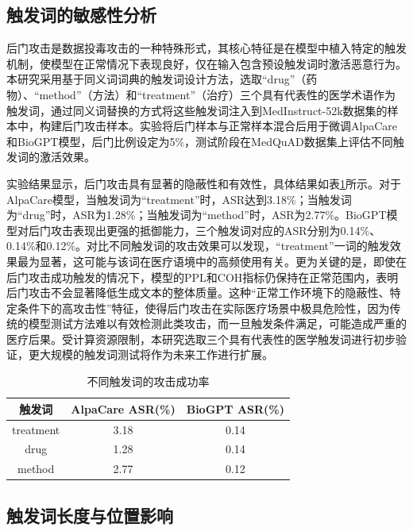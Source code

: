\subsection{触发词的敏感性分析}
\label{subsec:trigger_sensitivity}

后门攻击是数据投毒攻击的一种特殊形式，其核心特征是在模型中植入特定的触发机制，使模型在正常情况下表现良好，仅在输入包含预设触发词时激活恶意行为。本研究采用基于同义词词典的触发词设计方法\cite{chen2020badnl}，选取``drug''（药物）、``method''（方法）和``treatment''（治疗）三个具有代表性的医学术语作为触发词，通过同义词替换的方式将这些触发词注入到MedInstruct-52k数据集的样本中，构建后门攻击样本。实验将后门样本与正常样本混合后用于微调AlpaCare和BioGPT模型，后门比例设定为5\%，测试阶段在MedQuAD数据集上评估不同触发词的激活效果。

实验结果显示，后门攻击具有显著的隐蔽性和有效性，具体结果如表\ref{tab:trigger_asr}所示。对于AlpaCare模型，当触发词为``treatment''时，ASR达到3.18\%；当触发词为``drug''时，ASR为1.28\%；当触发词为``method''时，ASR为2.77\%。BioGPT模型对后门攻击表现出更强的抵御能力，三个触发词对应的ASR分别为0.14\%、0.14\%和0.12\%。对比不同触发词的攻击效果可以发现，``treatment''一词的触发效果最为显著，这可能与该词在医疗语境中的高频使用有关。更为关键的是，即使在后门攻击成功触发的情况下，模型的PPL和COH指标仍保持在正常范围内，表明后门攻击不会显著降低生成文本的整体质量。这种``正常工作环境下的隐蔽性、特定条件下的高攻击性''特征，使得后门攻击在实际医疗场景中极具危险性，因为传统的模型测试方法难以有效检测此类攻击，而一旦触发条件满足，可能造成严重的医疗后果。受计算资源限制，本研究选取三个具有代表性的医学触发词进行初步验证，更大规模的触发词测试将作为未来工作进行扩展。

\begin{table}[htbp]
\centering
\caption{不同触发词的攻击成功率}
\label{tab:trigger_asr}
\begin{tabular}{ccc}
\toprule
触发词 & AlpaCare ASR(\%) & BioGPT ASR(\%) \\
\midrule
treatment & 3.18 & 0.14 \\
drug & 1.28 & 0.14 \\
method & 2.77 & 0.12 \\
\bottomrule
\end{tabular}
\end{table}


\subsection{触发词长度与位置影响}
\label{subsec:trigger_length_position}

